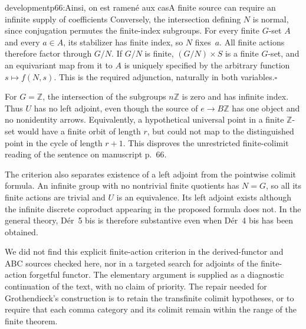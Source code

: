 \begin{dcomment}{development}{p66:Ainsi, on est ramené aux cas}{A finite source can require an infinite supply of coefficients}
Conversely, the intersection defining $N$ is normal, since conjugation permutes the finite-index subgroups. For every finite $G$-set $A$ and every $a\in A$, its stabilizer has finite index, so $N$ fixes~$a$. All finite actions therefore factor through $G/N$. If $G/N$ is finite, $(G/N)\times S$ is a finite $G$-set, and an equivariant map from it to $A$ is uniquely specified by the arbitrary function $s\mapsto f(N,s)$. This is the required adjunction, naturally in both variables.\hfill$\square$

For $G=\mathbb Z$, the intersection of the subgroups $n\mathbb Z$ is zero and has infinite index. Thus $U$ has no left adjoint, even though the source of $e\to B\mathbb Z$ has one object and no nonidentity arrows. Equivalently, a hypothetical universal point in a finite $\mathbb Z$-set would have a finite orbit of length $r$, but could not map to the distinguished point in the cycle of length $r+1$. This disproves the unrestricted finite-colimit reading of the sentence on manuscript p.~66.

The criterion also separates existence of a left adjoint from the pointwise colimit formula. An infinite group with no nontrivial finite quotients has $N=G$, so all its finite actions are trivial and $U$ is an equivalence. Its left adjoint exists although the infinite discrete coproduct appearing in the proposed formula does not. In the general theory, Dér~5 bis is therefore substantive even when Dér~4 bis has been obtained.

We did not find this explicit finite-action criterion in the derived-functor and ABC sources checked here, nor in a targeted search for adjoints of the finite-action forgetful functor. The elementary argument is supplied as a diagnostic continuation of the text, with no claim of priority. The repair needed for Grothendieck's construction is to retain the transfinite colimit hypotheses, or to require that each comma category and its colimit remain within the range of the finite theorem.
\end{dcomment}


